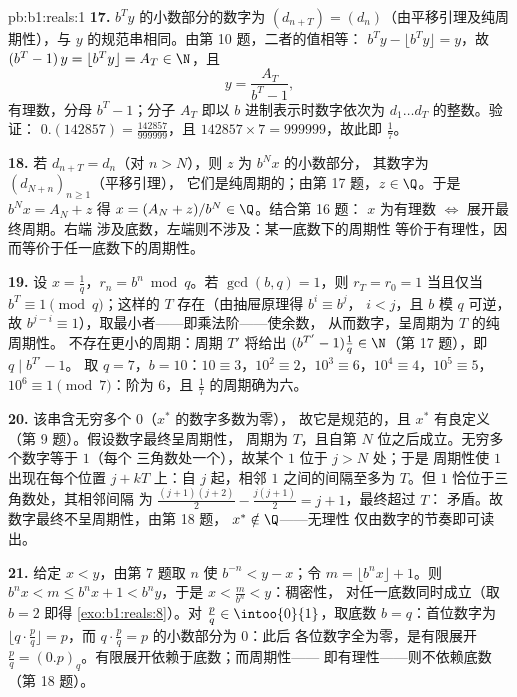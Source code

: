 \begin{solution}{pb:b1:reals:1}
\textbf{17.} $b^T y$ 的小数部分的数字为
$(d_{n+T}) = (d_n)$（由平移引理及纯周期性），与
$y$ 的规范串相同。由第 10 题，二者的值相等：
$b^T y - \lfloor b^T y \rfloor = y$，故 $(b^T - 1)\,y = \lfloor
b^T y \rfloor = A_T \in \N$，且
\[
y = \frac{A_T}{b^T - 1} ,
\]
有理数，分母 $b^T - 1$；分子 $A_T$
即以 $b$ 进制表示时数字依次为 $d_1 \dots d_T$ 的整数。验证：
$0.(142857) = \frac{142857}{999999}$，且 $142857 \times 7 =
999999$，故此即 $\frac 17$。

\textbf{18.} 若 $d_{n+T} = d_n$（对 $n > N$），则 $z$ 为 $b^N x$ 的小数部分，
其数字为 $(d_{N+n})_{n\geq1}$（平移引理），
它们是纯周期的；由第 17 题，$z \in \Q$。于是 $b^N
x = A_N + z$ 得 $x = (A_N + z)/b^N \in \Q$。结合第 16 题：
$x$ 为有理数 $\iff$ 展开最终周期。右端
涉及底数，左端则不涉及：某一底数下的周期性
等价于有理性，因而等价于任一底数下的周期性。

\textbf{19.} 设 $x = \frac 1q$，$r_n = b^n \bmod q$。若
$\gcd(b, q) = 1$，则 $r_T = r_0 = 1$ 当且仅当 $b^T \equiv
1 \pmod q$；这样的 $T$ 存在（由抽屉原理得 $b^i \equiv b^j$，
$i < j$，且 $b$ 模 $q$ 可逆，故 $b^{j-i} \equiv
1$），取最小者——即乘法阶——使余数，
从而数字，呈周期为 $T$ 的纯周期性。
不存在更小的周期：周期 $T'$ 将给出 $(b^{T'}
- 1)\frac1q \in \N$（第 17 题），即 $q \mid b^{T'} - 1$。
取 $q = 7$，$b = 10$：$10 \equiv 3$，$10^2 \equiv 2$，$10^3
\equiv 6$，$10^4 \equiv 4$，$10^5 \equiv 5$，$10^6 \equiv 1
\pmod 7$：阶为 $6$，且 $\frac 17$ 的周期确为六。

\textbf{20.} 该串含无穷多个 $0$（$x^*$ 的数字多数为零），
故它是规范的，且 $x^*$ 有良定义
（第 9 题）。假设数字最终呈周期性，
周期为 $T$，且自第 $N$ 位之后成立。无穷多个数字等于 $1$（每个
三角数处一个），故某个 $1$ 位于 $j > N$ 处；于是
周期性使 $1$ 出现在每个位置 $j + kT$ 上：自 $j$
起，相邻 $1$ 之间的间隔至多为 $T$。但
$1$ 恰位于三角数处，其相邻间隔
为 $\frac{(j+1)(j+2)}{2} - \frac{j(j+1)}{2} = j + 1$，最终超过 $T$：
矛盾。故数字最终不呈周期性，由第 18 题，
$x^* \notin \Q$——无理性
仅由数字的节奏即可读出。

\textbf{21.} 给定 $x < y$，由第 7 题取 $n$ 使 $b^{-n}
< y - x$；令 $m = \lfloor b^n x \rfloor + 1$。则 $b^n x < m
\leq b^n x + 1 < b^n y$，于是 $x < \frac{m}{b^n} < y$：稠密性，
对任一底数同时成立（取 $b = 2$ 即得
\cref{exo:b1:reals:8}）。对 $\frac pq \in \intoo{0}{1}$，取底数
$b = q$：首位数字为 $\lfloor q \cdot \frac pq \rfloor =
p$，而 $q \cdot \frac pq = p$ 的小数部分为 $0$：此后
各位数字全为零，是有限展开 $\frac pq =
(0.p)_q$。有限展开依赖于底数；而周期性——
即有理性——则不依赖底数（第 18 题）。


\end{solution}
